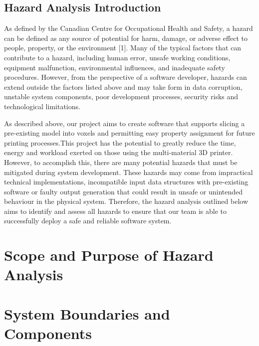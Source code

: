 \documentclass{article}
\begin{document}
\subsection{Hazard Analysis Introduction}

As defined by the Canadian Centre for Occupational Health and Safety, a hazard can be
defined as any source of potential for harm, damage, or adverse effect to people, property,
or the environment [1]. Many of the typical factors that can contribute to a hazard,
including human error, unsafe working conditions, equipment malfunction, environmental
influences, and inadequate safety procedures. However, from the perspective of a software
developer, hazards can extend outside the factors listed above and may take form in data
corruption, unstable system components, poor development processes, security risks and
technological limitations. \par \vspace{1em}

As described above, our project aims to create software that supports slicing a
pre-existing model into voxels and permitting easy property assignment for future
printing processes.This project has the potential to greatly reduce the time, energy
and workload exerted on those using the multi-material 3D printer. However, to accomplish
this, there are many potential hazards that must be mitigated during system development.
These hazards may come from impractical technical implementations, incompatible input data
structures with pre-existing software or faulty output generation that could result in
unsafe or unintended behaviour in the physical system. Therefore, the hazard analysis
outlined below aims to identify and assess all hazards to ensure that our team is able to
successfully deploy a safe and reliable software system.

\section{Scope and Purpose of Hazard Analysis}


\section{System Boundaries and Components}

\iffalse
\wss{Dividing the system into components will help you brainstorm the hazards.
You shouldn't do a full design of the components, just get a feel for the major
ones.  For projects that involve hardware, the components will typically include
each individual piece of hardware.  If your software will have a database, or an
important library, these are also potential components.}
\fi
\end{document}

